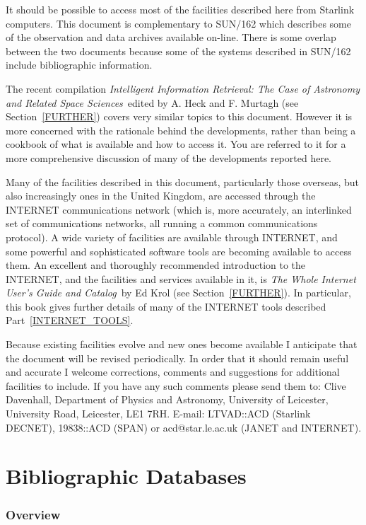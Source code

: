 \documentclass[twoside,11pt]{article}
\newcommand{\xref}[3]{#1}
\newcommand{\xlabel}[1]{}
\begin{document}
It should be possible to access most of the facilities described here 
from Starlink computers. This document is complementary to
\xref{SUN/162}{sun162}{} which
describes some of the observation and data archives available on-line.
There is some overlap between the two documents because some of the
systems described in
\xref{SUN/162}{sun162}{} include bibliographic information.

The recent compilation {\it Intelligent Information Retrieval: The
Case of Astronomy and Related Space Sciences}\, edited by A. Heck and
F. Murtagh (see Section~\ref{FURTHER}) covers very similar topics to 
this document. However it is more concerned with the rationale behind
the developments, rather than being a cookbook of what is available
and how to access it.  You are referred to it for a more comprehensive
discussion of many of the developments reported here.

Many of the facilities described in this document, particularly those 
overseas, but also increasingly ones in the United Kingdom, are accessed
through the INTERNET communications network (which is, more accurately, 
an interlinked set of communications networks, all running a common 
communications protocol). A wide variety of facilities are available 
through INTERNET, and some powerful and sophisticated software tools 
are becoming available to access them. An excellent and thoroughly 
recommended introduction to the INTERNET, and the facilities and 
services available in it, is {\it The Whole Internet User's Guide and 
Catalog}\, by Ed Krol (see Section~\ref{FURTHER}). In particular, this 
book gives further details of many of the INTERNET tools described
Part~\ref{INTERNET_TOOLS}.

Because existing facilities evolve and new ones become available I 
anticipate that the document will be revised periodically. In order that
it should remain useful and accurate I welcome corrections, comments and
suggestions for additional facilities to include. If you have any such 
comments please send them to: Clive Davenhall, Department of Physics and
Astronomy, University of Leicester, University Road, Leicester, LE1 7RH.
E-mail: LTVAD::ACD (Starlink DECNET), 19838::ACD (SPAN) or 
acd@star.le.ac.uk (JANET and INTERNET).


\pagebreak
\part{Bibliographic Databases}

\section{Overview\xlabel{overview}} 
\end{document}
